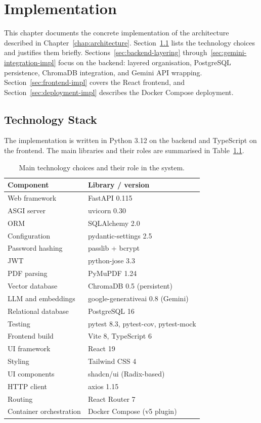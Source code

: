 \chapter{Implementation}
\label{chap:implementation}

This chapter documents the concrete implementation of the architecture
described in Chapter~\ref{chap:architecture}. Section~\ref{sec:stack} lists
the technology choices and justifies them briefly. Sections~\ref{sec:backend-layering}
through~\ref{sec:gemini-integration-impl} focus on the backend:
layered organisation, PostgreSQL persistence, ChromaDB integration, and
Gemini API wrapping. Section~\ref{sec:frontend-impl} covers the React
frontend, and Section~\ref{sec:deployment-impl} describes the Docker Compose
deployment.

\section{Technology Stack}
\label{sec:stack}

The implementation is written in Python 3.12 on the backend and TypeScript
on the frontend. The main libraries and their roles are summarised in
Table~\ref{tab:stack}.

\begin{table}[h]
\centering
\caption{Main technology choices and their role in the system.}
\label{tab:stack}
\begin{tabular}{l l}
\hline
\textbf{Component} & \textbf{Library / version} \\
\hline
Web framework         & FastAPI 0.115 \\
ASGI server           & uvicorn 0.30 \\
ORM                   & SQLAlchemy 2.0 \\
Configuration         & pydantic-settings 2.5 \\
Password hashing      & passlib + bcrypt \\
JWT                   & python-jose 3.3 \\
PDF parsing           & PyMuPDF 1.24 \\
Vector database       & ChromaDB 0.5 (persistent) \\
LLM and embeddings    & google-generativeai 0.8 (Gemini) \\
Relational database   & PostgreSQL 16 \\
Testing               & pytest 8.3, pytest-cov, pytest-mock \\
Frontend build        & Vite 8, TypeScript 6 \\
UI framework          & React 19 \\
Styling               & Tailwind CSS 4 \\
UI components         & shadcn/ui (Radix-based) \\
HTTP client           & axios 1.15 \\
Routing               & React Router 7 \\
Container orchestration & Docker Compose (v5 plugin) \\
\hline
\end{tabular}
\end{table}

